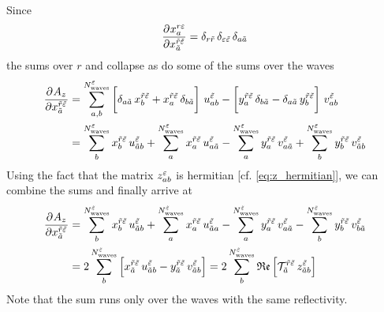 Since
\begin{equation}
  \dpd{x_a^{r \refl}}{{x_{\tilde{a}}^{\tilde{r} \tilde{\refl}}}}
  = \delta_{r \tilde{r}}\, \delta_{\refl \tilde{\refl}}\, \delta_{a \tilde{a}}
\end{equation}
the sums over $r$ and  collapse as do some of the sums over the waves
\begin{align}
  \dpd{A_z}{{x_{\tilde{a}}^{\tilde{r} \tilde{\refl}}}}
  &= \sum_{a, b}^{N^{\tilde{\refl}}_\text{waves}}
  \sBrk[3]{\delta_{a \tilde{a}}\, x_b^{\tilde{r} \tilde{\refl}}
    + x_a^{\tilde{r} \tilde{\refl}}\, \delta_{b \tilde{a}}}\, u^{\tilde{\refl}}_{a b}
  - \sBrk[3]{y_a^{\tilde{r} \tilde{\refl}}\, \delta_{b \tilde{a}}
    - \delta_{a \tilde{a}}\, y_b^{\tilde{r} \tilde{\refl}}}\, v^{\tilde{\refl}}_{a b} \\
  &= \sum_{b}^{N^{\tilde{\refl}}_\text{waves}} x_b^{\tilde{r} \tilde{\refl}}\, u^{\tilde{\refl}}_{\tilde{a} b}
    + \sum_{a}^{N^{\tilde{\refl}}_\text{waves}} x_a^{\tilde{r} \tilde{\refl}}\, u^{\tilde{\refl}}_{a \tilde{a}}
  - \sum_{a}^{N^{\tilde{\refl}}_\text{waves}} y_a^{\tilde{r} \tilde{\refl}}\, v^{\tilde{\refl}}_{a \tilde{a}}
    + \sum_{b}^{N^{\tilde{\refl}}_\text{waves}} y_b^{\tilde{r} \tilde{\refl}}\, v^{\tilde{\refl}}_{\tilde{a} b} \\
\end{align}
Using the fact that the matrix $z^\varepsilon_{a b}$ is hermitian
[cf. \cref{eq:z_hermitian}], we can combine the sums and finally arrive
at
\begin{align}
  \dpd{A_z}{{x_{\tilde{a}}^{\tilde{r} \tilde{\refl}}}}
  &= \sum_{b}^{N^{\tilde{\refl}}_\text{waves}} x_b^{\tilde{r} \tilde{\refl}}\, u^{\tilde{\refl}}_{\tilde{a} b}
    + \sum_{a}^{N^{\tilde{\refl}}_\text{waves}} x_a^{\tilde{r} \tilde{\refl}}\, u^{\tilde{\refl}}_{\tilde{a} a}
  - \sum_{a}^{N^{\tilde{\refl}}_\text{waves}} y_a^{\tilde{r} \tilde{\refl}}\, v^{\tilde{\refl}}_{a \tilde{a}}
    - \sum_{b}^{N^{\tilde{\refl}}_\text{waves}} y_b^{\tilde{r} \tilde{\refl}}\, v^{\tilde{\refl}}_{b \tilde{a}} \\
  \label{eq:likelihood_function_sum_term_re_deriv}
  &= 2 \sum_b^{N^{\tilde{\refl}}_\text{waves}} \sBrk{x_{\tilde{a}}^{\tilde{r} \tilde{\refl}}\, u^{\tilde{\refl}}_{\tilde{a} b}
    - y_{\tilde{a}}^{\tilde{r} \tilde{\refl}}\, v^{\tilde{\refl}}_{\tilde{a} b}}
  = 2 \sum_b^{N^{\tilde{\refl}}_\text{waves}} \Re\sBrk{\mathcal{T}_{\tilde{a}}^{\tilde{r} \tilde{\refl}}\, z^{\tilde{\refl}}_{\tilde{a} b}}
\end{align}
Note that the sum runs only over the waves with the same reflectivity.

